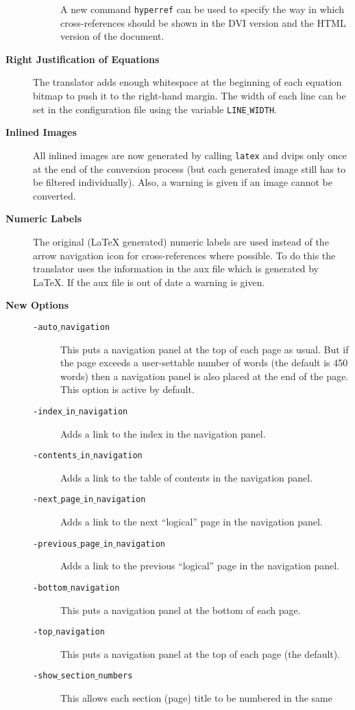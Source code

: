 \begin{description}
\begin{description}
A new command {\tt hyperref} can be used to specify the way in
which cross-references should be shown in the DVI version and the
HTML version of the document.
\end{description}
\item[{\bf Right Justification of Equations}]
The translator
adds enough whitespace at the beginning of each equation bitmap
to push it to the right-hand margin. The width of each line can be
set in the configuration file using the variable {\tt LINE$\_$WIDTH}.
\item[{\bf Inlined Images}]
All inlined images are now generated by calling {\tt latex} and {\fn
dvips} only once
at the end of the conversion process (but each generated image still
has to be filtered individually). Also, a warning is given if an 
image cannot be converted.
\item[{\bf Numeric Labels}]
The original (LaTeX generated) numeric labels are used instead of
the arrow navigation icon for cross-references where possible.
To do this the translator uses the information in the 
{\fn aux} file which is generated by \LaTeX. If the {\fn aux} file
is out of date a warning is given.
\item[{\bf New Options}] \hfill
\begin{description}
\item[{\tt -auto$\_$navigation}]
This puts a navigation panel 
at the top of each page as usual. But if the page exceeds a
user-settable  
number of words (the default is 450 words) 
then a navigation panel is also placed at the end of
the page. This option is active by default.
\item[{\tt -index$\_$in$\_$navigation}]
Adds a link to the index in the navigation panel.
\item[{\tt -contents$\_$in$\_$navigation}]
Adds a link to the table of contents in the navigation panel.
\item[{\tt -next$\_$page$\_$in$\_$navigation}]
Adds a link to the next ``logical'' page in the navigation panel.
\item[{\tt -previous$\_$page$\_$in$\_$navigation}]
Adds a link to the previous ``logical'' page in the navigation panel.
\item[{\tt -bottom$\_$navigation}]
This puts a navigation panel at the bottom of each page.
\item[{\tt -top$\_$navigation}]
This puts a navigation panel at the top of each page (the default).
\item[{\tt -show$\_$section$\_$numbers}]
This allows each section (page) title to be numbered in the same 

\end{description}
\end{description}
